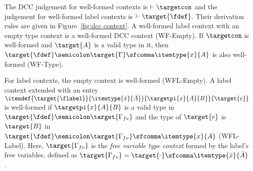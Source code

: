 The DCC judgement for well-formed contexts is $\vdash \targetcon$ and the judgement for well-formed label contexts is $\vdash \target{\fdef}$. Their derivation rules are given in Figure~\ref{fig:dcc context}. A well-formed label context with an empty type context is a well-formed DCC context (WF-Empty). 
If $\targetcon$ is well-formed and $\target{A}$ is a valid type in it, then $\target{\fdef} \semicolon \target{\Gamma} \sfcomma \itemtype{x}{A}$ is also well-formed (WF-Type). 

For label contexts, the empty context is well-formed (WFL-Empty). A label context extended with an entry $\itemdef{\target{\flabel}}{\itemtype{\bar{x}}{\bar{A}}}{\targetpi{x}{A}{B}}{\target{e}}$ is well-formed if $\targetpi{x}{A}{B}$ is a valid type in $\target{\fdef} \semicolon \target{\Gamma_{fv}}$ and the type of $\target{e}$ is $\target{B}$ in $\target{\fdef} \semicolon \target{\Gamma_{fv}} \sfcomma \itemtype{x}{A}$ (WFL-Label). Here, $\target{\Gamma_{fv}}$ is the \textit{free variable type context} formed by the label's free variables, defined as $\target{\Gamma_{fv}} = \target{\cdot} \sfcomma \itemtype{\bar{x}}{\bar{A}}$.

